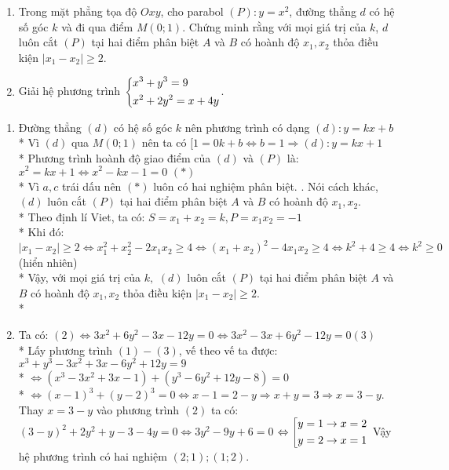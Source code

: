 \begin{ex}%
 \hfill
    \begin{enumerate}
    \item Trong mặt phẳng tọa độ $Oxy$, cho parabol $(P): y=x^{2}$,  đường thẳng $d$ có hệ số góc $k$ và đi qua điểm $M(0;1)$. Chứng minh rằng với mọi giá trị của $k$, $d$ luôn cắt $(P)$ tại hai điểm phân biệt $A$ và $B$ có hoành độ $x_{1},x_{2}$ thỏa điều kiện $|x_{1}-x_{2}|\geq 2$.
    \item Giải hệ phương trình $\left\{\begin{aligned}&x^{3} + y^{3} = 9\\ &x^{2} + 2y^{2} = x + 4y\end{aligned}\right.$.
    \end{enumerate}
\loigiai
    {
    \begin{enumerate}
        \item Đường thẳng $(d)$ có hệ số góc $k$ nên phương trình có dạng $(d):y = kx + b$\\*
        Vì $(d)$ qua $M(0;1)$ nên ta có $[1 = 0k + b \Leftrightarrow b = 1 \Rightarrow (d):y = kx + 1$ \\*
        Phương trình hoành độ giao điểm của $(d)$ và $(P)$ là: ${x^2} = kx + 1 \Leftrightarrow {x^2} - kx - 1 = 0\,\,(*)$ \\*
        Vì $a,c$ trái dấu nên $(*)$ luôn có hai nghiệm phân biệt. . Nói cách khác, $(d)$ luôn cắt $(P)$ tại hai điểm phân biệt $A$ và $B$ có hoành độ $x_{1},x_{2}$.\\*
        Theo định lí Viet, ta có: $S={{x}_{1}}+{{x}_{2}}=k,P={{x}_{1}}{{x}_{2}}=-1$ \\*
        Khi đó: $\left| {{x}_{1}}-{{x}_{2}} \right|\ge 2\Leftrightarrow x_{1}^{2}+x_{2}^{2}-2{{x}_{1}}{{x}_{2}}\ge 4\Leftrightarrow {{\left( {{x}_{1}}+{{x}_{2}} \right)}^{2}}-4{{x}_{1}}{{x}_{2}}\ge 4\Leftrightarrow {{k}^{2}}+4\ge 4\Leftrightarrow {{k}^{2}}\ge 0$ (hiển nhiên) \\*
        Vậy, với mọi giá trị của $k,\,\,(d)$ luôn cắt $(P)$ tại hai điểm phân biệt $A$ và $B$ có hoành độ ${{x}_{1}},{{x}_{2}}$ thỏa điều kiện $\left| {{x}_{1}}-{{x}_{2}} \right|\ge 2.$\\*
        \item Ta có: $(2) \Leftrightarrow 3x^{2}+6y^{2}-3x-12y=0 \Leftrightarrow 3x^{2}-3x+6y^{2}-12y=0  (3)$ \\*
            Lấy phương trình $(1)-(3)$, vế theo vế ta được: $x^{3}+y^{3}-3x^{2}+3x-6y^{2}+12y=9$\\*
            $\Leftrightarrow (x^{3}-3x^{2}+3x-1)+(y^{3}-6y^{2}+12y-8)=0$ \\*
            $\Leftrightarrow (x-1)^{3}+(y-2)^{3}=0 \Leftrightarrow x-1=2-y \Rightarrow x+y=3 \Rightarrow x=3-y.$
            Thay $x=3-y$ vào phương trình $(2)$ ta có:$(3-y)^{2}+2y^{2}+y-3-4y=0 \Leftrightarrow 3y^{2}-9y+6=0$
            $\Leftrightarrow \left[\begin{aligned}&y=1 \rightarrow x=2\\ &y=2 \rightarrow x=1\end{aligned}\right.$
            Vậy hệ phương trình có hai nghiệm $(2;1);(1;2)$.
    \end{enumerate}
    }
\end{ex}


